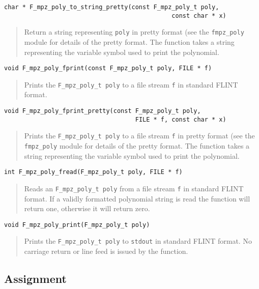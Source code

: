 \documentclass[a4paper,10pt]{article}
\newcommand{\code}{\lstinline}
\begin{document}
\begin{lstlisting}
char * F_mpz_poly_to_string_pretty(const F_mpz_poly_t poly, 
                                              const char * x)
\end{lstlisting}
\begin{quote}
Return a string representing \code{poly} in pretty format (see the \code{fmpz_poly} module for
details of the pretty format. The function takes a string representing the variable symbol 
used to print the polynomial.
\end{quote}

\begin{lstlisting}
void F_mpz_poly_fprint(const F_mpz_poly_t poly, FILE * f)
\end{lstlisting}
\begin{quote}
Prints the \code{F_mpz_poly_t poly} to a file stream \code{f} in standard FLINT format.
\end{quote}

\begin{lstlisting}
void F_mpz_poly_fprint_pretty(const F_mpz_poly_t poly, 
                                    FILE * f, const char * x)
\end{lstlisting}
\begin{quote}
Prints the \code{F_mpz_poly_t poly} to a file stream \code{f} in pretty format (see the 
\code{fmpz_poly} module for details of the pretty format. The function takes a string representing 
the variable symbol used to print the polynomial.
\end{quote}

\begin{lstlisting}
int F_mpz_poly_fread(F_mpz_poly_t poly, FILE * f)
\end{lstlisting}
\begin{quote}
Reads an \code{F_mpz_poly_t poly} from a file stream \code{f} in standard FLINT format. If a validly
formatted polynomial string is read the function will return one, otherwise it will return zero.
\end{quote}

\begin{lstlisting}
void F_mpz_poly_print(F_mpz_poly_t poly)
\end{lstlisting}
\begin{quote}
Prints the \code{F_mpz_poly_t poly} to \code{stdout} in standard FLINT format. No carriage return
or line feed is issued by the function.
\end{quote}

\subsection{Assignment}
\end{document}
